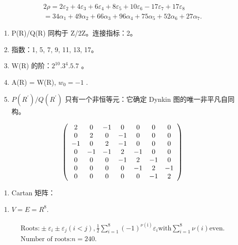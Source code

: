 \[
\begin{array}{l} 2 \rho = 2 \varepsilon_ {2} + 4 \varepsilon_ {3} + 6 \varepsilon_ {4} + 8 \varepsilon_ {5} + 10 \varepsilon_ {6} - 17 \varepsilon_ {7} + 17 \varepsilon_ {8} \\ = 34 \alpha_ {1} + 49 \alpha_ {2} + 66 \alpha_ {3} + 96 \alpha_ {4} + 75 \alpha_ {5} + 52 \alpha_ {6} + 27 \alpha_ {7}. \end{array}
\]


\begin{enumerate}
\def\labelenumi{(\Roman{enumi})}
\setcounter{enumi}{7}
\item
  P(R)/Q(R) 同构于 Z/2Z。连接指标：2。
\item
  指数：1, 5, 7, 9, 11, 13, 17。
\item
  W(R) 的阶：\(2^{10}.3^{4}.5.7\) 。
\item
  A(R) = W(R), \(w_{0} = -1\) .
\item
  \(P(R^{\prime})/Q(R^{\prime})\) 只有一个非恒等元：它确定 Dynkin 图的唯一非平凡自同构。
\end{enumerate}

\[
\left( \begin{array}{c c c c c c c} 2 & 0 & - 1 & 0 & 0 & 0 & 0 \\ 0 & 2 & 0 & - 1 & 0 & 0 & 0 \\ - 1 & 0 & 2 & - 1 & 0 & 0 & 0 \\ 0 & - 1 & - 1 & 2 & - 1 & 0 & 0 \\ 0 & 0 & 0 & - 1 & 2 & - 1 & 0 \\ 0 & 0 & 0 & 0 & - 1 & 2 & - 1 \\ 0 & 0 & 0 & 0 & 0 & - 1 & 2 \end{array} \right)
\]

\begin{enumerate}
\def\labelenumi{(\Roman{enumi})}
\setcounter{enumi}{12}
\tightlist
\item
  Cartan 矩阵：
\end{enumerate}


\begin{enumerate}
\def\labelenumi{(\Roman{enumi})}
\tightlist
\item
  \(V = E = R^{8}.\)
\end{enumerate}

\[
\begin{array}{l} \text {Roots:} \pm \varepsilon_ {i} \pm \varepsilon_ {j} (i <   j), \frac {1}{2} \sum_ {i = 1} ^ {8} (- 1) ^ {\nu (\mathrm{i})} \varepsilon_ {i} \text {with} \sum_ {i = 1} ^ {8} \nu (i) \text {even.} \\ \text {Number of roots:} n = 240. \end{array}
\]

